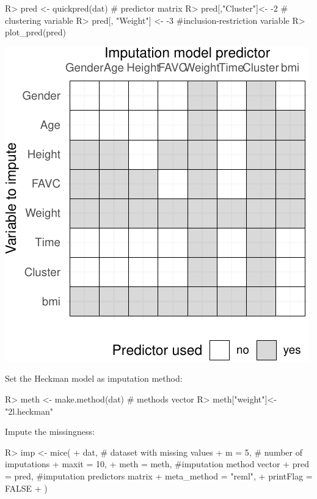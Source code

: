 \documentclass[
]{jss}
\begin{document}
\begin{CodeChunk}
\begin{CodeInput}
R> pred <- quickpred(dat)   # predictor matrix
R> pred[,"Cluster"]<- -2 # clustering variable
R> pred[, "Weight"] <- -3 #inclusion-restriction variable
R> plot_pred(pred)
\end{CodeInput}


\begin{center}\includegraphics{Imputation_of_Incomplete_Multilevel_Data_files/figure-latex/obesity-pred-1} \end{center}

\end{CodeChunk}

Set the Heckman model as imputation method:

\begin{CodeChunk}
\begin{CodeInput}
R> meth <- make.method(dat) # methods vector
R> meth["weight"]<-"2l.heckman"
\end{CodeInput}
\end{CodeChunk}

Impute the missingness:

\begin{CodeChunk}
\begin{CodeInput}
R> imp <- mice(
+   dat, # dataset with missing values
+   m = 5, # number of imputations
+   maxit = 10,
+   meth = meth, #imputation method vector
+   pred = pred, #imputation predictors matrix
+   meta_method = "reml",
+   printFlag = FALSE
+ )
\end{CodeInput}
\end{CodeChunk}
\end{document}
